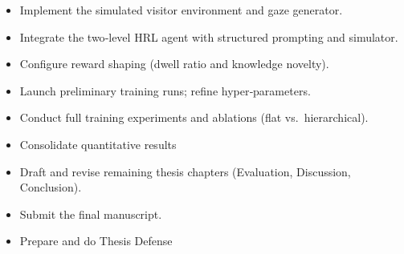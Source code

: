 \documentclass[12pt]{article}
\begin{document}
\begin{description}[leftmargin=1.8cm, labelindent=0cm, itemsep=0.6em]
    \item[August]%
      \begin{itemize}[noitemsep]
        \item Implement the simulated visitor environment and gaze generator.
        \item Integrate the two‑level HRL agent with structured prompting and simulator.
      \end{itemize}

    \item[September]%
      \begin{itemize}[noitemsep]
        \item Configure reward shaping (dwell ratio and knowledge novelty).
        \item Launch preliminary training runs; refine hyper‑parameters.
      \end{itemize}

    \item[October]%
      \begin{itemize}[noitemsep]
        \item Conduct full training experiments and ablations (flat vs.\ hierarchical).
      \end{itemize}

    \item[November]%
      \begin{itemize}[noitemsep]
        \item Consolidate quantitative results
        \item Draft and revise remaining thesis chapters (Evaluation, Discussion, Conclusion).
        \item Submit the final manuscript.
        \end{itemize}
        
    \item[December]%
      \begin{itemize}[noitemsep]
        \item Prepare and do Thesis Defense 
      \end{itemize}
\end{description}



\end{document}
